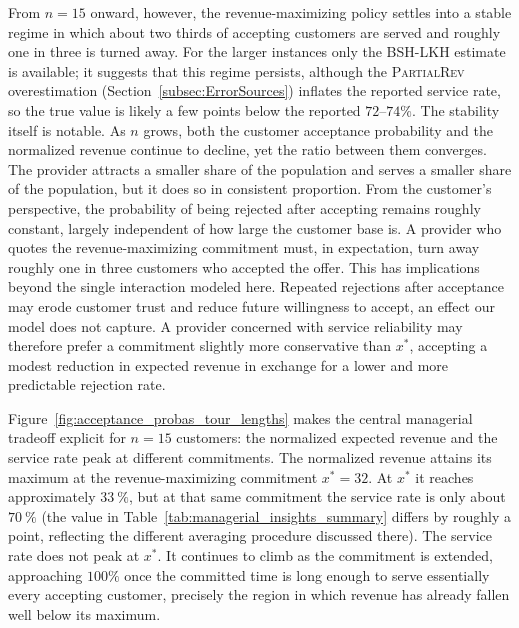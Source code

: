 \documentclass[11pt]{article}
\theoremstyle{plain}
\theoremstyle{definition}
\newcommand{\jnote}[1]{{\color{red}[{\tiny \textbf{Julian:} \bf #1}]\marginpar{\color{red}*}}}
\newcommand{\jnote}[1]{}
\begin{document}
 From $n = 15$ onward, however, the revenue-maximizing policy settles into a stable regime in which about two thirds of accepting customers are served and roughly one in three is turned away. For the larger instances only the BSH-\ac{LKH} estimate is available; it suggests that this regime persists, although the \textsc{PartialRev} overestimation (Section~\ref{subsec:ErrorSources}) inflates the reported service rate, so the true value is likely a few points below the reported $72$--$74\%$. The stability itself is notable. As $n$ grows, both the customer acceptance probability and the normalized revenue continue to decline, yet the ratio between them converges. The provider attracts a smaller share of the population and serves a smaller share of the population, but it does so in consistent proportion. From the customer's perspective, the probability of being rejected after accepting remains roughly constant, largely independent of how large the customer base is. A provider who quotes the revenue-maximizing commitment must, in expectation, turn away roughly one in three customers who accepted the offer. This has implications beyond the single interaction modeled here. Repeated rejections after acceptance may erode customer trust and reduce future willingness to accept, an effect our model does not capture. A provider concerned with service reliability may therefore prefer a commitment slightly more conservative than $x^*$, accepting a modest reduction in expected revenue in exchange for a lower and more predictable rejection rate.
 
 
 Figure~\ref{fig:acceptance_probas_tour_lengths} makes the central managerial tradeoff
 explicit for $n = 15$ customers: the normalized expected revenue and the service rate peak
 at different commitments. The normalized revenue attains its maximum at the revenue-maximizing
 commitment $x^* = 32$. At $x^*$ it reaches approximately $33~\%$, but at
 that same commitment the service rate is only about $70~\%$ (the value in Table~\ref{tab:managerial_insights_summary}
 differs by roughly a point, reflecting the different averaging procedure discussed there). The service rate does not peak at $x^*$. It continues to climb as the commitment is
 extended, approaching $100\%$ once the committed time is long enough to serve essentially every
 accepting customer, precisely the region in which revenue has already fallen well below its
 maximum.
 
\end{document}
